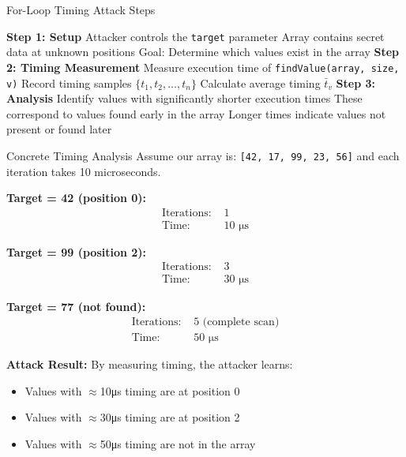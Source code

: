 \documentclass[12pt,a4paper]{article}
\theoremstyle{definition}
\begin{document}
\begin{algorithmbox}{For-Loop Timing Attack Steps}
\begin{algorithmic}
\STATE \textbf{Step 1: Setup}
\STATE Attacker controls the \texttt{target} parameter
\STATE Array contains secret data at unknown positions
\STATE Goal: Determine which values exist in the array
\STATE 
\STATE \textbf{Step 2: Timing Measurement}
    \STATE Measure execution time of \texttt{findValue(array, size, v)}
    \STATE Record timing samples $\{t_1, t_2, \ldots, t_n\}$
    \STATE Calculate average timing $\bar{t}_v$
\ENDFOR
\STATE 
\STATE \textbf{Step 3: Analysis}
\STATE Identify values with significantly shorter execution times
\STATE These correspond to values found early in the array
\STATE Longer times indicate values not present or found later
\end{algorithmic}
\end{algorithmbox}

\begin{examplebox}{Concrete Timing Analysis}
Assume our array is: \texttt{[42, 17, 99, 23, 56]} and each iteration takes 10 microseconds.

\textbf{Target = 42 (position 0):}
\begin{align}
\text{Iterations: } &1 \\
\text{Time: } &10 \text{ μs}
\end{align}

\textbf{Target = 99 (position 2):}
\begin{align}
\text{Iterations: } &3 \\
\text{Time: } &30 \text{ μs}
\end{align}

\textbf{Target = 77 (not found):}
\begin{align}
\text{Iterations: } &5 \text{ (complete scan)} \\
\text{Time: } &50 \text{ μs}
\end{align}

\textbf{Attack Result:} By measuring timing, the attacker learns:
\begin{itemize}
    \item Values with $\approx$10μs timing are at position 0
    \item Values with $\approx$30μs timing are at position 2  
    \item Values with $\approx$50μs timing are not in the array
\end{itemize}
\end{examplebox}
\end{document}
